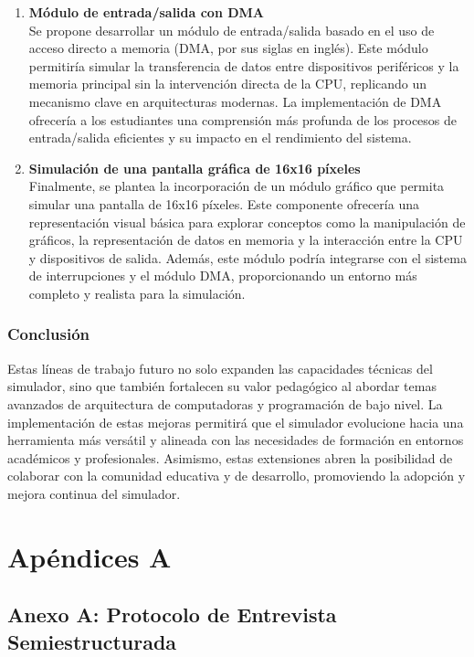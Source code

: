 \documentclass[12pt,oneside]{templates/unerthesis}
\begin{document}
\begin{enumerate}
\item
  \textbf{Módulo de entrada/salida con DMA}\\
  Se propone desarrollar un módulo de entrada/salida basado en el uso de acceso directo a memoria (DMA, por sus siglas en inglés). Este módulo permitiría simular la transferencia de datos entre dispositivos periféricos y la memoria principal sin la intervención directa de la CPU, replicando un mecanismo clave en arquitecturas modernas. La implementación de DMA ofrecería a los estudiantes una comprensión más profunda de los procesos de entrada/salida eficientes y su impacto en el rendimiento del sistema.
\item
  \textbf{Simulación de una pantalla gráfica de 16x16 píxeles}\\
  Finalmente, se plantea la incorporación de un módulo gráfico que permita simular una pantalla de 16x16 píxeles. Este componente ofrecería una representación visual básica para explorar conceptos como la manipulación de gráficos, la representación de datos en memoria y la interacción entre la CPU y dispositivos de salida. Además, este módulo podría integrarse con el sistema de interrupciones y el módulo DMA, proporcionando un entorno más completo y realista para la simulación.
\end{enumerate}

\hypertarget{conclusiuxf3n}{%
\subsection{Conclusión}\label{conclusiuxf3n}}

Estas líneas de trabajo futuro no solo expanden las capacidades técnicas del simulador, sino que también fortalecen su valor pedagógico al abordar temas avanzados de arquitectura de computadoras y programación de bajo nivel. La implementación de estas mejoras permitirá que el simulador evolucione hacia una herramienta más versátil y alineada con las necesidades de formación en entornos académicos y profesionales. Asimismo, estas extensiones abren la posibilidad de colaborar con la comunidad educativa y de desarrollo, promoviendo la adopción y mejora continua del simulador.

\hypertarget{apuxe9ndices-a}{%
\chapter*{Apéndices A}\label{apuxe9ndices-a}}

\hypertarget{anexoA}{%
\section{Anexo A: Protocolo de Entrevista Semiestructurada}\label{anexoA}}
\end{document}

